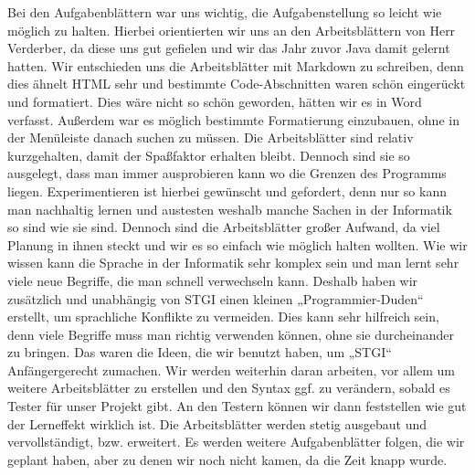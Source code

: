 \documentclass[a4paper, 12pt]{article}
\begin{document}
Bei den Aufgabenblättern war uns wichtig, die Aufgabenstellung so leicht wie möglich zu halten. Hierbei orientierten wir uns an den Arbeitsblättern von Herr Verderber, da diese uns gut gefielen und wir das Jahr zuvor Java damit gelernt hatten. Wir entschieden uns die Arbeitsblätter mit Markdown zu schreiben, denn dies ähnelt HTML sehr und bestimmte Code-Abschnitten waren schön eingerückt und formatiert. 
Dies wäre nicht so schön geworden, hätten wir es in Word verfasst. Außerdem war es möglich bestimmte Formatierung einzubauen, ohne in der Menüleiste danach suchen zu müssen.
Die Arbeitsblätter sind relativ kurzgehalten, damit der Spaßfaktor erhalten bleibt. Dennoch sind sie so ausgelegt, dass man immer ausprobieren kann wo die Grenzen des Programms liegen. Experimentieren ist hierbei gewünscht und gefordert, denn nur so kann man nachhaltig lernen und austesten weshalb manche Sachen in der Informatik so sind wie sie sind. Dennoch sind die Arbeitsblätter großer Aufwand, da viel Planung in ihnen steckt und wir es so einfach wie möglich halten wollten.
Wie wir wissen kann die Sprache in der Informatik sehr komplex sein und man lernt sehr viele neue Begriffe, die man schnell verwechseln kann. Deshalb haben wir zusätzlich und unabhängig von STGI einen kleinen „Programmier-Duden“ erstellt, um sprachliche Konflikte zu vermeiden. Dies kann sehr hilfreich sein, denn viele Begriffe muss man richtig verwenden können, ohne sie durcheinander zu bringen. 
Das waren die Ideen, die wir benutzt haben, um „STGI“ Anfängergerecht zumachen. Wir werden weiterhin daran arbeiten, vor allem um weitere Arbeitsblätter zu erstellen und den Syntax ggf. zu verändern, sobald es Tester für unser Projekt gibt. An den Testern können wir dann feststellen wie gut der Lerneffekt wirklich ist. Die Arbeitsblätter werden stetig ausgebaut und vervollständigt, bzw. erweitert. Es werden weitere Aufgabenblätter folgen, die wir geplant haben, aber zu denen wir noch nicht kamen, da die Zeit knapp wurde. 
\end{document}
